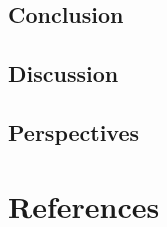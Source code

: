 \documentclass[12pt]{book}
\begin{document}
\section{Conclusion}
\lipsum

\section{Discussion}
\lipsum

\section{Perspectives}
\lipsum


\lipsum[1-4]

\chapter*{References}

\nocite{*}
\end{document}
